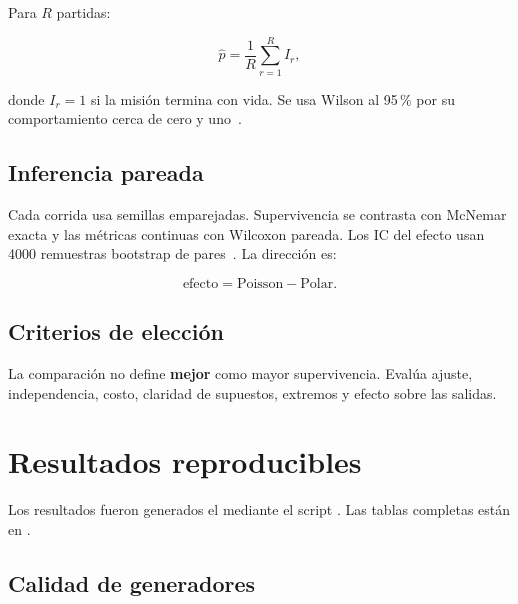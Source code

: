 \documentclass[11pt,a4paper]{article}
\begin{document}
Para $R$ partidas:

\begin{equation}
\widehat p=\frac{1}{R}\sum_{r=1}^{R}I_r,
\end{equation}

donde $I_r=1$ si la misión termina con vida. Se usa Wilson al 95\,\% por su
comportamiento cerca de cero y uno~\cite{wilson}.

\subsection{Inferencia pareada}

Cada corrida usa semillas emparejadas. Supervivencia se contrasta con McNemar
exacta y las métricas continuas con Wilcoxon pareada. Los IC del efecto usan
4000 remuestras bootstrap de pares~\cite{efron}. La dirección es:

\begin{equation}
\text{efecto}=\text{Poisson}-\text{Polar}.
\end{equation}

\subsection{Criterios de elección}

La comparación no define \textbf{mejor} como mayor supervivencia. Evalúa ajuste,
independencia, costo, claridad de supuestos, extremos y efecto sobre las salidas.

\section{Resultados reproducibles}

Los resultados fueron generados el \ResultsDate{} mediante el script
. Las tablas completas están en
.

\subsection{Calidad de generadores}
\end{document}
